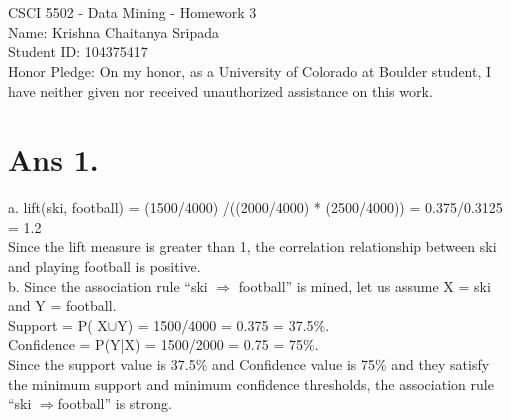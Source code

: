 \documentclass[10pt]{article}
\begin{document}
\section*{}
\begin{flushleft}
CSCI 5502 - Data Mining - Homework 3\\
Name: Krishna Chaitanya Sripada\\
Student ID: 104375417\\
Honor Pledge: On my honor, as a University of Colorado at Boulder student, I have neither given nor received unauthorized assistance on this work.
\end{flushleft}
\section*{Ans 1.}
\begin{flushleft}
a. lift(ski, football) =  (1500/4000) /((2000/4000) * (2500/4000)) = 0.375/0.3125 = 1.2\\
Since the lift measure is greater than 1, the correlation relationship between ski and playing football is positive.\\
\vspace{0.5em}
b. Since the association rule ``ski $\Rightarrow$ football'' is mined, let us assume X = ski and Y = football.\\
Support = P( X$\cup$Y) = 1500/4000 = 0.375 = 37.5\%.\\
Confidence = P(Y|X) = 1500/2000 = 0.75 = 75\%.\\
Since the support value is 37.5\% and Confidence value is 75\% and they satisfy the minimum support and minimum confidence thresholds, the association rule ``ski $\Rightarrow$football''  is strong.
\end{flushleft}
\end{document}
